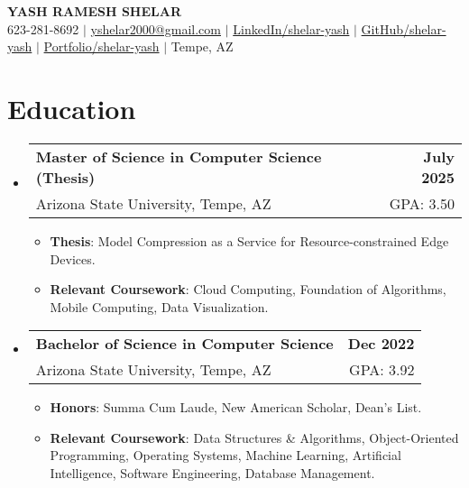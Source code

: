 \documentclass[a4paper, 10pt]{article}
\makeatletter
\newcommand{\resumeEducationContent}[4]{
  \item
    \begin{tabular*}{\textwidth}[t]{l@{\extracolsep{\fill}}r}
      \textbf{#1} & \textbf{#2} \\ 
      {#3} & {#4} \\
    \end{tabular*}
}
\makeatother
\begin{document}
\justifying
\begin{center}
    \textbf{\Large \scshape YASH RAMESH SHELAR} \\
         {623-281-8692} $|$ \href{mailto:yshelar2000@gmail.com}{yshelar2000@gmail.com} $|$ 
    \href{https://www.linkedin.com/in/shelar-yash/}{LinkedIn/shelar-yash} $|$
    \href{https://github.com/YashShelar007}{GitHub/shelar-yash} $|$ 
    \href{https://yashshelar.com/}{Portfolio/shelar-yash} $|$ Tempe, AZ
\end{center}
\vspace{-15pt}
\section{Education}
    \vspace{-5pt}
    \begin{itemize}[itemsep=1pt, leftmargin=0in, label={}]
        \resumeEducationContent
          {Master of Science in Computer Science (Thesis)}{July 2025}
          {Arizona State University, Tempe, AZ}{GPA: 3.50}
          \vspace{-10pt}
          \begin{itemize}[itemsep=-1pt]
              \item{\textbf{Thesis}: Model Compression as a Service for Resource-constrained Edge Devices.}
              \item{\textbf{Relevant Coursework}: Cloud Computing, Foundation of Algorithms, Mobile Computing, Data Visualization.}
          \end{itemize}
        \resumeEducationContent
          {Bachelor of Science in Computer Science}{Dec 2022}
          {Arizona State University, Tempe, AZ}{GPA: 3.92}
          \vspace{-10pt}
          \begin{itemize}[itemsep=-1pt]
              \item{\textbf{Honors}: Summa Cum Laude, New American Scholar, Dean’s List.}
              \item{
              \textbf{Relevant Coursework}: Data Structures \& Algorithms, Object-Oriented Programming, Operating Systems, Machine Learning, Artificial Intelligence, Software Engineering, Database Management.}
          \end{itemize}
    \end{itemize}

\vspace{-15pt}
\end{document}
